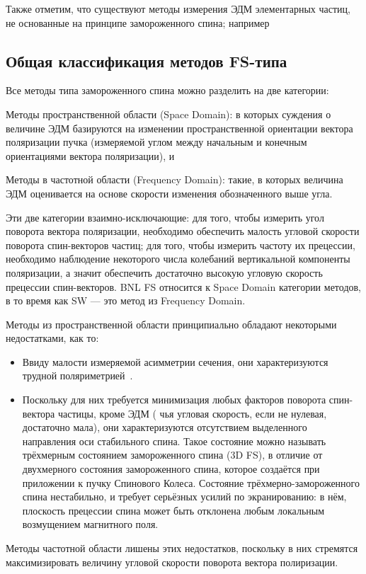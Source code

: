 Также отметим, что существуют методы измерения ЭДМ элементарных частиц, не основанные на принципе замороженного спина; например~\cite{COSY:SpinTuneMapping}

\subsection{Общая классификация методов FS-типа}
Все методы типа замороженного спина можно разделить на две категории: 
\begin{enumerate*}
	\item Методы пространственной области (Space Domain): в которых суждения о величине ЭДМ базируются на изменении пространственной ориентации вектора поляризации пучка (измеряемой углом между начальным и конечным ориентациями вектора поляризации), и 
	\item Методы в частотной области (Frequency Domain): такие, в которых величина ЭДМ оценивается на основе 
	скорости изменения обозначенного выше угла.
\end{enumerate*} 

Эти две категории взаимно-исключающие: для того, чтобы измерить
угол поворота вектора поляризации, необходимо обеспечить малость угловой скорости поворота спин-векторов
частиц; для того, чтобы измерить частоту их прецессии, необходимо наблюдение некоторого числа
колебаний вертикальной компоненты поляризации, а значит обеспечить достаточно высокую угловую скорость
прецессии спин-векторов. BNL FS относится к Space Domain категории методов, в то время как SW --- это
метод из Frequency Domain.

Методы из пространственной области принципиально обладают некоторыми недостатками, как то:
\begin{itemize}
	\item Ввиду малости измеряемой асимметрии сечения, они характеризуются трудной поляриметрией~\cite[стр.~6]{Mane:SpinWheel}.
	\item Поскольку для них требуется минимизация любых факторов поворота спин-вектора частицы, кроме ЭДМ (
	чья угловая скорость, если не нулевая, достаточно мала), они характеризуются отсутствием выделенного 
	направления оси стабильного спина. Такое состояние можно называть трёхмерным состоянием замороженного спина
	(3D FS), в отличие от двухмерного состояния замороженного спина, которое создаётся при приложении к
	пучку Спинового Колеса. Состояние трёхмерно-замороженного спина нестабильно, и требует серьёзных усилий
	по экранированию: в нём, плоскость прецессии спина может быть отклонена любым локальным возмущением магнитного поля.
\end{itemize}

Методы частотной области лишены этих недостатков, поскольку в них стремятся максимизировать величину
угловой скорости поворота вектора полиризации.
